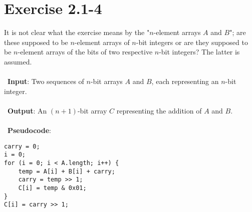 \documentclass{article}
\begin{document}
\section*{Exercise 2.1-4}

It is not clear what the exercise means by the "$n$-element arrays $A$ and $B$"; are these supposed to be $n$-element arrays of $n$-bit integers or are they supposed to be $n$-element arrays of the bits of two respective $n$-bit integers? The latter is assumed.
\\ \\
\noindent~\textbf{Input}: Two sequences of $n$-bit arrays $A$ and $B$, each representing an $n$-bit integer.
\\ \\
\noindent~\textbf{Output}: An $(n + 1)$-bit array $C$ representing the addition of $A$ and $B$.
\\ \\
\noindent~\textbf{Pseudocode}:
\begin{verbatim}
carry = 0;
i = 0;
for (i = 0; i < A.length; i++) {
    temp = A[i] + B[i] + carry;
    carry = temp >> 1;
    C[i] = temp & 0x01;
}
C[i] = carry >> 1;
\end{verbatim}
\end{document}
